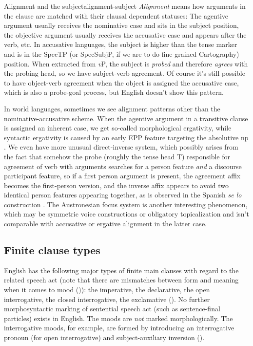 \documentclass[UTF8, a4paper, oneside, scheme=plain]{ctexrep}
\newcommand*{\term}[1]{\emph{#1}}
\newcommand{\corpus}[1]{\emph{#1}}
\newcommand{\vP}{\textit{v}P}
\begin{document}
\begin{theorybox}{Alignment and the subject}{alignment-subject}
    \term{Alignment} means how arguments in the clause 
    are matched with their clausal dependent statuses:
    The agentive argument usually receives the nominative case and sits in the subject position, 
    the objective argument usually receives the accusative case and appears after the verb, etc.
    In accusative languages,
    the subject is higher than the tense marker
    and is in the SpecTP (or SpecSubjP, if we are to do fine-grained Cartography) position.
    When extracted from \vP{},
    the subject is \emph{probed} and therefore \emph{agrees} with the probing head,
    so we have subject-verb agreement.
    Of course it's still possible to have object-verb agreement
    when the object is assigned the accusative case, 
    which is also a probe-goal process,
    but English doesn't show this pattern.

    In world languages, sometimes we see alignment patterns other than the nominative-accusative scheme.
    When the agentive argument in a transitive clause is assigned an inherent case, 
    we get so-called morphological ergativity,
    while syntactic ergativity is caused by an early EPP feature 
    targeting the absolutive \acs{np} \citep{aldridge2008generative}.
    We even have more unusual direct-inverse system,
    which possibly arises from the fact that 
    somehow the probe (roughly the tense head T) responsible for agreement of verb with arguments 
    searches for a person feature \emph{and} a discourse participant feature,
    so if a first person argument is present,
    the agreement affix becomes the first-person version,
    and the inverse affix appears to avoid two identical person features appearing together,
    as is observed in the Spanish \corpus{se lo} construction
    \citep{oxford2017inverse}.
    The Austronesian focus system \citep{chen2019western} is another interesting phenomenon,
    which may be symmetric voice constructions or obligatory topicalization 
    and isn't comparable with accusative or ergative alignment in the latter case.
\end{theorybox}

\subsection{Finite clause types}

English has the following major types of finite main clauses with regard to the related speech act
(note that there are mismatches between form and meaning when it comes to mood ()):
the imperative, the declarative, 
the open interrogative, the closed interrogative,
the exclamative ().
No further morphosyntactic marking of sentential speech act (such as sentence-final particles)
exists in English.
The moods are \emph{not} marked morphologically.
The interrogative moods, for example, are formed by introducing an interrogative pronoun (for open interrogative)
and subject-auxiliary inversion (). 
\end{document}
